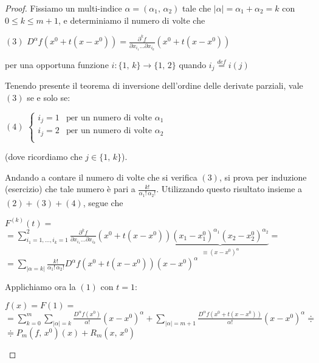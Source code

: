 \begin{proof}
Fissiamo un multi-indice $\alpha = (\alpha_1,\,\alpha_2)$ tale che $|\alpha| = \alpha_1+\alpha_2 = k$ con $0 \leq k \leq m+1$, e determiniamo il numero di volte che
\begin{center}
$\mathrm{(3)}$
\hfill
$\displaystyle D^{\alpha} f (x^0 + t(x-x^0)) = \frac{\partial^k f}{\partial x_{i_1} \ldots \partial x_{i_k}} (x^0 + t(x-x^0))$
\hfill \null \\
\end{center}
per una opportuna funzione $i : \lbrace 1,\,k \rbrace \longrightarrow \lbrace 1,\,2 \rbrace$ quando $i_j \overset{def}{=} i(j)$

Tenendo presente il teorema di inversione dell'ordine delle derivate parziali, vale $\mathrm{(3)}$ se e solo se:
\begin{center}
$\mathrm{(4)}$
\hfill
$\displaystyle 
\begin{cases}
i_j = 1 & \text{per un numero di volte $\alpha_1$}\\
i_j = 2 & \text{per un numero di volte $\alpha_2$}\\
\end{cases}
$
\hfill \null \\
\end{center}
(dove ricordiamo che $j \in \lbrace 1,\,k \rbrace$).

Andando a contare il numero di volte che si verifica $\mathrm{(3)}$, si prova per induzione (esercizio) che tale numero è pari a $\displaystyle \frac{k!}{\alpha_1!\, \alpha_2!}$. Utilizzando questo risultato insieme a $(2)+(3)+(4)$, segue che
\begin{flushleft}
$\displaystyle F^{(k)}(t) =$\\
$\displaystyle = \sum_{i_1=1,\ldots,i_k=1}^2
\frac{\partial^k f}{\partial x_{i_1} \ldots \partial x_{i_k}}(x^0+t(x-x^0))
\underbrace{(x_1-x_1^0)^{\alpha_1} (x_2-x_2^0)^{\alpha_2}}_{\equiv (x-x^0)^{\alpha}}=$\\
$\displaystyle = \sum_{|\alpha=k|}
\frac{k!}{\alpha_1!\, \alpha_2!} D^{\alpha}f(x^0+t(x-x^0))
(x-x^0)^{\alpha}$
\end{flushleft}
Applichiamo ora la $\mathrm{(1)}$ con $t=1$:
\begin{flushleft}
$\displaystyle f(x) = F(1) =$\\
$\displaystyle = \sum_{k=0}^m \sum_{|\alpha|=k} \frac{D^{\alpha}f(x^0)}{\alpha!}(x-x^0)^{\alpha} + \sum_{|\alpha|=m+1} \frac{D^{\alpha}f(x^0+t(x-x^0))}{\alpha!}(x-x^0)^{\alpha} \doteqdot $\\
$\displaystyle \doteqdot P_m(f,\,x^0)(x) + R_m(x,\,x^0)$
\end{flushleft}
\end{proof}

